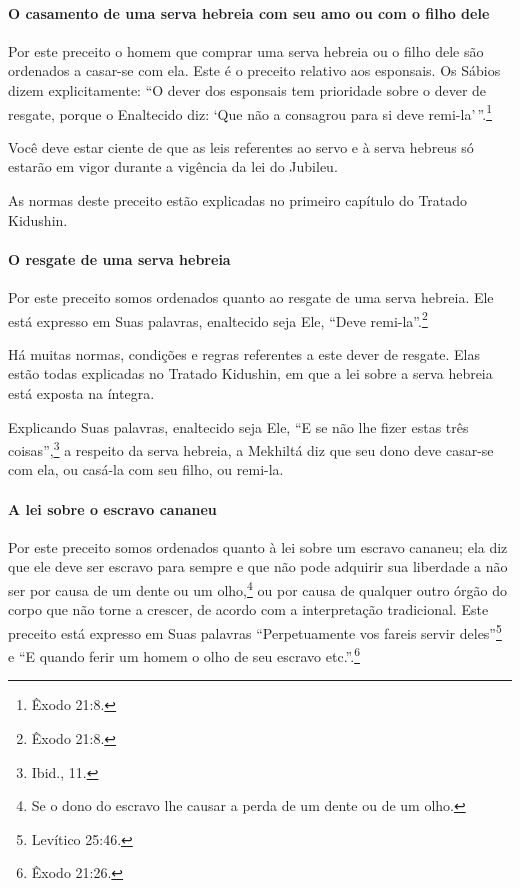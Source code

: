 \paragraph{O casamento de uma serva hebreia com seu amo ou com o filho dele}

Por este preceito o homem que comprar uma serva hebreia ou o filho dele
são ordenados a casar-se com ela. Este é o preceito relativo aos
esponsais. Os Sábios dizem explicitamente: ``O dever dos esponsais tem
prioridade sobre o dever de resgate, porque o Enaltecido diz: `Que não a
consagrou para si deve remi-la'\,''.\footnote{Êxodo 21:8.}

Você deve estar ciente de que as leis referentes ao servo e à serva
hebreus só estarão em vigor durante a vigência da lei do Jubileu.

As normas deste preceito estão explicadas no primeiro capítulo do
Tratado Kidushin.

\paragraph{O resgate de uma serva hebreia}

Por este preceito somos ordenados quanto ao resgate de uma serva
hebreia. Ele está expresso em Suas palavras, enaltecido seja Ele, ``Deve
remi-la''.\footnote{Êxodo 21:8.}

Há muitas normas, condições e regras referentes a este dever de
resgate. Elas estão todas explicadas no Tratado Kidushin, em que a lei
sobre a serva hebreia está exposta na íntegra.

Explicando Suas palavras, enaltecido seja Ele, ``E se não lhe fizer
estas três coisas'',\footnote{Ibid., 11.} a respeito da serva hebreia, a
Mekhiltá diz que seu dono deve casar-se com ela, ou casá-la com seu
filho, ou remi-la.

\paragraph{A lei sobre o escravo cananeu}

Por este preceito somos ordenados quanto à lei sobre um escravo cananeu;
ela diz que ele deve ser escravo para sempre e que não pode adquirir sua
liberdade a não ser por causa de um dente ou um
olho,\footnote{Se o dono do escravo lhe causar a perda de um dente ou de um olho.} ou por causa de qualquer outro órgão do
corpo que não torne a crescer, de acordo com a interpretação
tradicional. Este preceito está expresso em Suas palavras
``Perpetuamente vos fareis servir deles''\footnote{Levítico 25:46.} e ``E quando
ferir um homem o olho de seu escravo etc.''.\footnote{Êxodo 21:26.}

